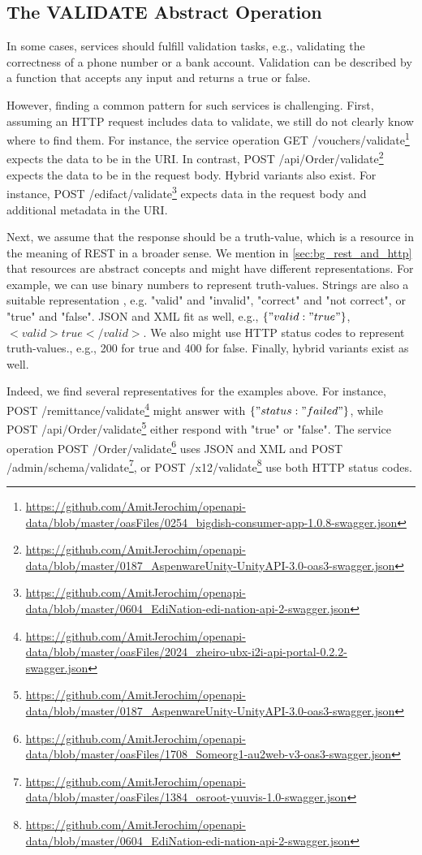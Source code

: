 \subsection{The VALIDATE Abstract Operation }
In some cases, services should fulfill validation tasks, e.g., validating the correctness of a phone number or a bank account. Validation can be described by a function that accepts any input and returns a true or false. 

However, finding a common pattern for such services is challenging. First, assuming an HTTP request includes data to validate, we still do not clearly know where to find them. For instance, the service operation GET /vouchers/validate\footnote{\url{https://github.com/AmitJerochim/openapi-data/blob/master/oasFiles/0254_bigdish-consumer-app-1.0.8-swagger.json}} expects the data to be in the URI. In contrast, POST /api/Order/validate\footnote{\url{https://github.com/AmitJerochim/openapi-data/blob/master/0187_AspenwareUnity-UnityAPI-3.0-oas3-swagger.json}} expects the data to be in the request body.
Hybrid variants also exist. For instance, POST /edifact/validate\footnote{\url{https://github.com/AmitJerochim/openapi-data/blob/master/0604_EdiNation-edi-nation-api-2-swagger.json}} expects data in the request body and additional metadata in the URI.

Next, we assume that the response should be a truth-value, which is a resource in the meaning of REST in a broader sense. We mention in \ref{sec:bg_rest_and_http} that resources are abstract concepts and might have different representations. For example, we can use binary numbers to represent truth-values. Strings are also a suitable representation , e.g. "valid" and "invalid", "correct" and "not correct", or "true" and "false". JSON and XML fit as well, e.g., $\{ "valid:"true"\}$, $<valid>true</valid>$. We also might use HTTP status codes to represent truth-values., e.g., 200 for true and 400 for false. Finally, hybrid variants exist as well.

Indeed, we find several representatives for the examples above. For instance, POST /remittance/validate\footnote{\url{https://github.com/AmitJerochim/openapi-data/blob/master/oasFiles/2024_zheiro-ubx-i2i-api-portal-0.2.2-swagger.json}} might answer with $\{ "status:"failed"\}$, while POST /api/Order/validate\footnote{\url{https://github.com/AmitJerochim/openapi-data/blob/master/0187_AspenwareUnity-UnityAPI-3.0-oas3-swagger.json}} either respond with "true" or "false". The service operation POST /Order/validate\footnote{\url{https://github.com/AmitJerochim/openapi-data/blob/master/oasFiles/1708_Someorg1-au2web-v3-oas3-swagger.json}} uses JSON and XML and POST /admin/schema/validate\footnote{\url{https://github.com/AmitJerochim/openapi-data/blob/master/oasFiles/1384_osroot-yuuvis-1.0-swagger.json}}, or POST /x12/validate\footnote{\url{https://github.com/AmitJerochim/openapi-data/blob/master/0604_EdiNation-edi-nation-api-2-swagger.json}} use both HTTP status codes.

